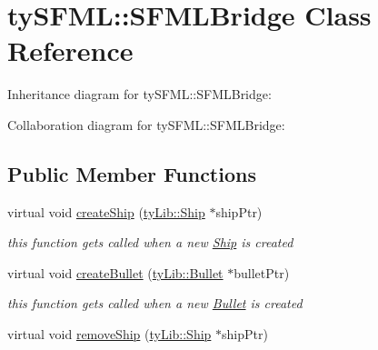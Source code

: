 \hypertarget{classty_s_f_m_l_1_1_s_f_m_l_bridge}{}\section{ty\+S\+F\+M\+L\+:\+:S\+F\+M\+L\+Bridge Class Reference}
\label{classty_s_f_m_l_1_1_s_f_m_l_bridge}


Inheritance diagram for ty\+S\+F\+M\+L\+:\+:S\+F\+M\+L\+Bridge\+:


Collaboration diagram for ty\+S\+F\+M\+L\+:\+:S\+F\+M\+L\+Bridge\+:
\subsection*{Public Member Functions}
\begin{DoxyCompactItemize}
\item 
\hypertarget{classty_s_f_m_l_1_1_s_f_m_l_bridge_af137b63ac7c8a69c51a58fbf1cba4de2}{}virtual void \hyperlink{classty_s_f_m_l_1_1_s_f_m_l_bridge_af137b63ac7c8a69c51a58fbf1cba4de2}{create\+Ship} (\hyperlink{classty_lib_1_1_ship}{ty\+Lib\+::\+Ship} $\ast$ship\+Ptr)\label{classty_s_f_m_l_1_1_s_f_m_l_bridge_af137b63ac7c8a69c51a58fbf1cba4de2}

\begin{DoxyCompactList}\small\item\em this function get\textquotesingle{}s called when a new \hyperlink{classty_s_f_m_l_1_1_ship}{Ship} is created \end{DoxyCompactList}\item 
\hypertarget{classty_s_f_m_l_1_1_s_f_m_l_bridge_ac65eef8683b545b060d940851d7ee65c}{}virtual void \hyperlink{classty_s_f_m_l_1_1_s_f_m_l_bridge_ac65eef8683b545b060d940851d7ee65c}{create\+Bullet} (\hyperlink{classty_lib_1_1_bullet}{ty\+Lib\+::\+Bullet} $\ast$bullet\+Ptr)\label{classty_s_f_m_l_1_1_s_f_m_l_bridge_ac65eef8683b545b060d940851d7ee65c}

\begin{DoxyCompactList}\small\item\em this function get\textquotesingle{}s called when a new \hyperlink{classty_s_f_m_l_1_1_bullet}{Bullet} is created \end{DoxyCompactList}\item 
\hypertarget{classty_s_f_m_l_1_1_s_f_m_l_bridge_a71e47d4b75a9a292540df8a5aa2d0121}{}virtual void \hyperlink{classty_s_f_m_l_1_1_s_f_m_l_bridge_a71e47d4b75a9a292540df8a5aa2d0121}{remove\+Ship} (\hyperlink{classty_lib_1_1_ship}{ty\+Lib\+::\+Ship} $\ast$ship\+Ptr)\label{classty_s_f_m_l_1_1_s_f_m_l_bridge_a71e47d4b75a9a292540df8a5aa2d0121}


\end{DoxyCompactItemize}
